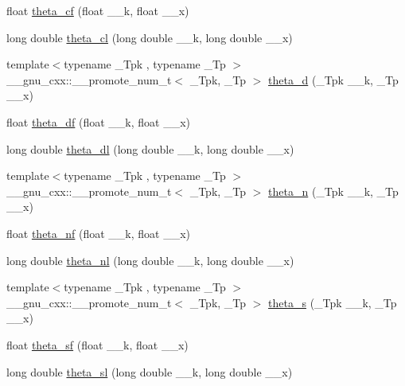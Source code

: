 \begin{DoxyCompactItemize}
\item 
float \hyperlink{namespace____gnu__cxx_a409f898afeaad5e25726ad552cfe6946}{theta\+\_\+cf} (float \+\_\+\+\_\+k, float \+\_\+\+\_\+x)
\item 
long double \hyperlink{namespace____gnu__cxx_a0531098c628999cf396217ff997cfdda}{theta\+\_\+cl} (long double \+\_\+\+\_\+k, long double \+\_\+\+\_\+x)
\item 
{\footnotesize template$<$typename \+\_\+\+Tpk , typename \+\_\+\+Tp $>$ }\\\+\_\+\+\_\+gnu\+\_\+cxx\+::\+\_\+\+\_\+promote\+\_\+num\+\_\+t$<$ \+\_\+\+Tpk, \+\_\+\+Tp $>$ \hyperlink{namespace____gnu__cxx_a030a1ea3efa82f6fbaeac0ed2d6191c2}{theta\+\_\+d} (\+\_\+\+Tpk \+\_\+\+\_\+k, \+\_\+\+Tp \+\_\+\+\_\+x)
\item 
float \hyperlink{namespace____gnu__cxx_ad2dc6fcaf54d25cbfaad082623941118}{theta\+\_\+df} (float \+\_\+\+\_\+k, float \+\_\+\+\_\+x)
\item 
long double \hyperlink{namespace____gnu__cxx_acce4474168b9638ebeaad1c7b351fa04}{theta\+\_\+dl} (long double \+\_\+\+\_\+k, long double \+\_\+\+\_\+x)
\item 
{\footnotesize template$<$typename \+\_\+\+Tpk , typename \+\_\+\+Tp $>$ }\\\+\_\+\+\_\+gnu\+\_\+cxx\+::\+\_\+\+\_\+promote\+\_\+num\+\_\+t$<$ \+\_\+\+Tpk, \+\_\+\+Tp $>$ \hyperlink{namespace____gnu__cxx_aa2791768016201c6dab2984bf04ec4b4}{theta\+\_\+n} (\+\_\+\+Tpk \+\_\+\+\_\+k, \+\_\+\+Tp \+\_\+\+\_\+x)
\item 
float \hyperlink{namespace____gnu__cxx_a5298a95e02bd909d55e59c1f2a0b51f8}{theta\+\_\+nf} (float \+\_\+\+\_\+k, float \+\_\+\+\_\+x)
\item 
long double \hyperlink{namespace____gnu__cxx_a907f6c147387d55d2dfccbc58d1f1bc5}{theta\+\_\+nl} (long double \+\_\+\+\_\+k, long double \+\_\+\+\_\+x)
\item 
{\footnotesize template$<$typename \+\_\+\+Tpk , typename \+\_\+\+Tp $>$ }\\\+\_\+\+\_\+gnu\+\_\+cxx\+::\+\_\+\+\_\+promote\+\_\+num\+\_\+t$<$ \+\_\+\+Tpk, \+\_\+\+Tp $>$ \hyperlink{namespace____gnu__cxx_a6eea3110c964e5d065d99f2e58a1ed56}{theta\+\_\+s} (\+\_\+\+Tpk \+\_\+\+\_\+k, \+\_\+\+Tp \+\_\+\+\_\+x)
\item 
float \hyperlink{namespace____gnu__cxx_a5e69cf30c9a4cc057accc43e8c4bf7a3}{theta\+\_\+sf} (float \+\_\+\+\_\+k, float \+\_\+\+\_\+x)
\item 
long double \hyperlink{namespace____gnu__cxx_ac574077067a4e7b24a0a9ff2d537d885}{theta\+\_\+sl} (long double \+\_\+\+\_\+k, long double \+\_\+\+\_\+x)

\end{DoxyCompactItemize}
